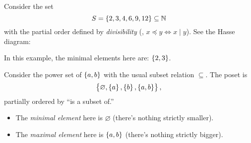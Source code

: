 \documentclass[11pt,openany]{article}
\begin{document}
\begin{example*}
Consider the set \[
S=\set{2,3,4,6,9, 12}\subseteq\mathbb{N}
\] with the partial order defined by \textit{divisibility} (\ie, $x\preceq y\iff x\mid y$). See the Hasse diagram:
\begin{center}
\hspace{20pt}
\end{center}
In this example, the minimal elements here are: $\set{2,3}$.
\end{example*} 
\begin{example*}
Consider the power set of $\set{a,b}$ with the usual subset relation $\subseteq$. The poset is \[
\set{\varnothing,\set{a},\set{b},\set{a,b}},
\] partially ordered by ``is a subset of.''
\begin{center}
\end{center}
\begin{itemize}
	\item The \textit{minimal element} here is $\varnothing$ (there's nothing strictly smaller).
	\item The \textit{maximal element} here is $\set{a,b}$ (there's nothing strictly bigger).
\end{itemize}
\end{example*}
\end{document}
